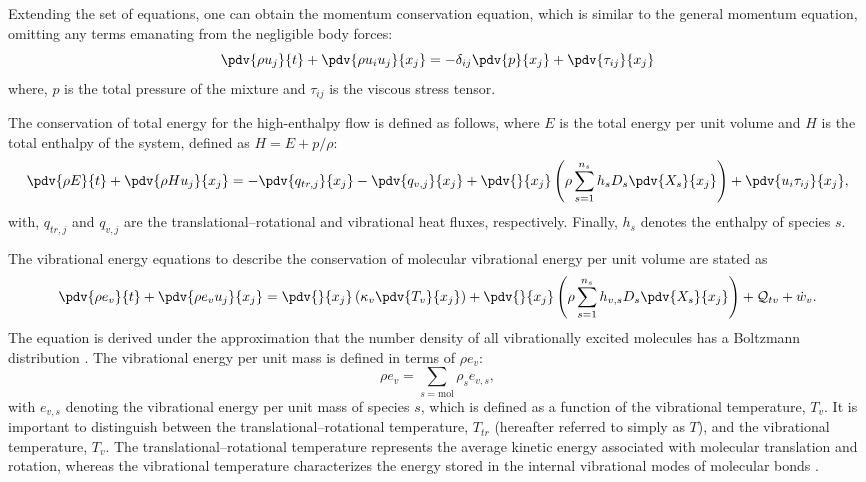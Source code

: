 Extending the set of equations, one can obtain the momentum conservation equation, which is similar to the general momentum equation, omitting any terms emanating from the negligible body forces:
\begin{equation}\label{equation:global_momentum}
    \pdv{\rho u_j}{t} + \pdv{\rho u_{i} u_{j}}{x_{j}}  = - \delta_{ij} \pdv{p}{x_{j}} + \pdv{\tau_{ij}}{x_{j}} 
\end{equation}
where, $p$ is the total pressure of the mixture and $\tau_{ij}$ is the viscous stress tensor.

The conservation of total energy for the high-enthalpy flow is defined as follows, where $E$ is the total energy per unit volume and $H$ is the total enthalpy of the system, defined as $H = E + p/\rho$:
\begin{equation}\label{equation:global_total_energy}
\begin{split}
\pdv{\rho E}{t} + \pdv{\rho H u_j}{x_j}
= - \pdv{q_{tr,j}}{x_j}
  - \pdv{q_{v,j}}{x_j}
  + \pdv{}{x_j} \left( \rho \sum_{s=1}^{n_s} h_s D_s \pdv{X_s}{x_j} \right)
  + \pdv{u_i \tau_{ij}}{x_j},
\end{split}
\end{equation}
with, $q_{tr,j}$ and $q_{v,j}$ are the translational--rotational and vibrational heat fluxes, respectively. Finally, $h_s$ denotes the enthalpy of species $s$.

The vibrational energy equations to describe the conservation of molecular vibrational energy per unit volume are stated as
\begin{equation}\label{equation:conservation_vibration}
\begin{split}
\pdv{\rho e_{v}}{t} + \pdv{\rho e_{v} u_j}{x_j} = \pdv{}{x_j} \left( \kappa_{v} \pdv{T_v}{x_j} \right) + \pdv{}{x_j} \left( \rho \sum^{n_s}_{s=1} h_{v,s} D_s \pdv{X_s}{x_j} \right) + \mathcal{Q}_{tv} + \dot{w}_{v}.
\end{split}
\end{equation}
The equation is derived under the approximation that the number density of all vibrationally excited molecules has a Boltzmann distribution \citep{Gnoffo1989}. The vibrational energy per unit mass is defined in terms of $\rho e_v$:
\begin{equation}
    \rho e_v = \sum_{s=\mathrm{mol}} \rho_s e_{v,s}, 
\end{equation} with $e_{v,s}$ denoting the vibrational energy per unit mass of species $s$, which is defined as a function of the vibrational temperature, $T_v$. It is important to distinguish between the translational--rotational temperature, $T_{tr}$ (hereafter referred to simply as $T$), and the vibrational temperature, $T_v$. The translational--rotational temperature represents the average kinetic energy associated with molecular translation and rotation, whereas the vibrational temperature characterizes the energy stored in the internal vibrational modes of molecular bonds \citep{Vincenti1965}.

